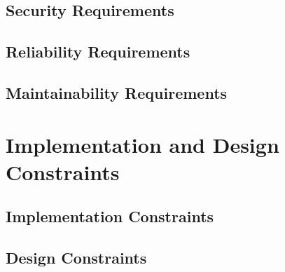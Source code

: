 \subsection{Security Requirements}
\subsection{Reliability Requirements}
\subsection{Maintainability Requirements}

\section{Implementation and Design Constraints}
\subsection{Implementation Constraints}
\subsection{Design Constraints}
